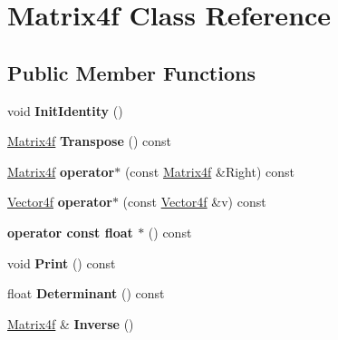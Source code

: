 \hypertarget{classMatrix4f}{\section{Matrix4f Class Reference}
\label{classMatrix4f}
}
\subsection*{Public Member Functions}
\begin{DoxyCompactItemize}
\item 
\hypertarget{classMatrix4f_a5cedfa71f928157c3ed4516edc72cb9c}{void {\bfseries Init\-Identity} ()}\label{classMatrix4f_a5cedfa71f928157c3ed4516edc72cb9c}

\item 
\hypertarget{classMatrix4f_aaa55b11a3b44065ebaea23750d8f15f2}{\hyperlink{classMatrix4f}{Matrix4f} {\bfseries Transpose} () const }\label{classMatrix4f_aaa55b11a3b44065ebaea23750d8f15f2}

\item 
\hypertarget{classMatrix4f_adbda08a5bee8094658af28bfaa851e1c}{\hyperlink{classMatrix4f}{Matrix4f} {\bfseries operator$\ast$} (const \hyperlink{classMatrix4f}{Matrix4f} \&Right) const }\label{classMatrix4f_adbda08a5bee8094658af28bfaa851e1c}

\item 
\hypertarget{classMatrix4f_ae41adb262631b053ab76c68a36be4c4e}{\hyperlink{structVector4f}{Vector4f} {\bfseries operator$\ast$} (const \hyperlink{structVector4f}{Vector4f} \&v) const }\label{classMatrix4f_ae41adb262631b053ab76c68a36be4c4e}

\item 
\hypertarget{classMatrix4f_ab6bc3cb75cb930b2eed630dda75499d2}{{\bfseries operator const float $\ast$} () const }\label{classMatrix4f_ab6bc3cb75cb930b2eed630dda75499d2}

\item 
\hypertarget{classMatrix4f_a99eef2db139a6334b4d53b5876b364bf}{void {\bfseries Print} () const }\label{classMatrix4f_a99eef2db139a6334b4d53b5876b364bf}

\item 
\hypertarget{classMatrix4f_ab61077c954bd8bcc6f422b2ba9109685}{float {\bfseries Determinant} () const }\label{classMatrix4f_ab61077c954bd8bcc6f422b2ba9109685}

\item 
\hypertarget{classMatrix4f_af1e77173b3f52e2b7a75ca03999d3a4d}{\hyperlink{classMatrix4f}{Matrix4f} \& {\bfseries Inverse} ()}\label{classMatrix4f_af1e77173b3f52e2b7a75ca03999d3a4d}


\end{DoxyCompactItemize}
